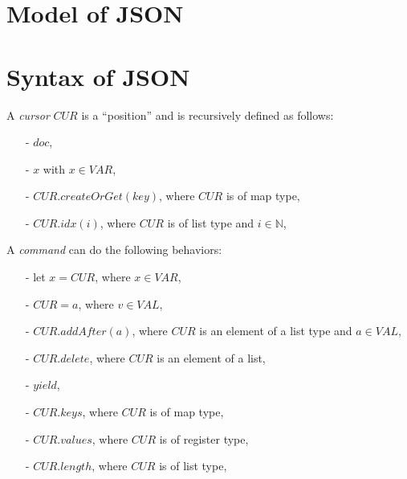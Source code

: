 
\section{Model of JSON}
\label{sec:model of json}



\section{Syntax of JSON}
\label{sec:syntax of json}

A \emph{cursor} $CUR$ is a ``position'' and is recursively defined as follows:

\begin{itemize}
\setlength{\itemsep}{0.5pt}
\item[-] $doc$,

\item[-] $x$ with $x \in VAR$,

\item[-] $CUR.createOrGet(key)$, where $CUR$ is of map type,

\item[-] $CUR.idx(i)$, where $CUR$ is of list type and $i \in \mathbb{N}$,
\end{itemize}

A \emph{command} can do the following behaviors:

\begin{itemize}
\setlength{\itemsep}{0.5pt}
\item[-] let $x = CUR$, where $x \in VAR$,

\item[-] $CUR = a$, where $v \in VAL$,

\item[-] $CUR.addAfter(a)$, where $CUR$ is an element of a list type and $a \in VAL$,

\item[-] $CUR.delete$, where $CUR$ is an element of a list,

\item[-] $yield$,

\item[-] $CUR.keys$, where $CUR$ is of map type,

\item[-] $CUR.values$, where $CUR$ is of register type,

\item[-] $CUR.length$, where $CUR$ is of list type,
\end{itemize}

